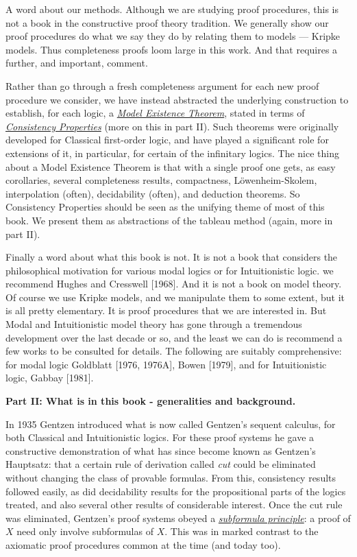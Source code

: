 A word about our methods.
% 
% 
Although we are studying proof procedures, 
this is not a book in the constructive proof theory tradition.
% 
We generally show our proof procedures do what we say they do by relating them to models --- Kripke models.
% 
Thus completeness proofs loom large in this work.
% 
And that requires a further, and important, comment.



Rather than go through a fresh completeness argument for each new proof procedure we consider, 
we have instead abstracted the underlying construction to establish, 
for each logic, 
a \underline{\textit{Model Existence Theorem}}, 
stated in terms of \underline{\textit{Consistency Properties}} (more on this in part II). 
% 
Such theorems were originally developed for Classical first-order logic, 
and have played a significant role for extensions of it, in particular, for certain of the infinitary logics.
% 
The nice thing about a Model Existence Theorem is that with a single proof one gets, 
as easy corollaries, 
several completeness results, compactness,
L\"{o}wenheim-Skolem,
interpolation (often), decidability (often), and deduction theorems.
% 
% 
So Consistency Properties should be seen as the unifying theme of most of this book.
% 
We present them as abstractions of the tableau method
(again, more in part II).


Finally a word about what this book is not. 
% 
It is not a book that considers the philosophical motivation for various modal logics or for Intuitionistic logic.
% 
we recommend Hughes and Cresswell [1968].
% 
% 
And it is not a book on model theory.
Of course we use Kripke models, 
and we manipulate them to some extent, but it is all pretty elementary.
% 
It is proof procedures that we are interested in.
% 
But Modal and Intuitionistic model theory has gone through a tremendous development over the last decade or so, 
and the least we can do is recommend a few works to be consulted for details.
% 
% 
The following are suitably comprehensive: 
for modal logic Goldblatt [1976, 1976A], Bowen [1979], 
and for Intuitionistic logic, Gabbay [1981].

\vspace{2em}
\noindent
\textbf{Part II: What is in this book - generalities and background.}


In 1935 Gentzen introduced what is now called Gentzen's sequent calculus, for both Classical and Intuitionistic logics.
% 
For these proof systems he gave a constructive demonstration of what has since become known as Gentzen's Hauptsatz: 
that a certain rule of derivation called \textit{cut} could be eliminated without changing the class of provable formulas.
% 
% 
From this, 
consistency results followed easily, 
as did decidability results for the propositional parts of the logics treated, 
and also several other results of considerable interest.
% 
% 
Once the cut rule was eliminated, 
Gentzen's proof systems obeyed a \textit{\underline{subformula principle}}:
a proof of $X$ need only involve subformulas of $X$.
% 
This was in marked contrast to the axiomatic proof procedures common at the time (and today too).





